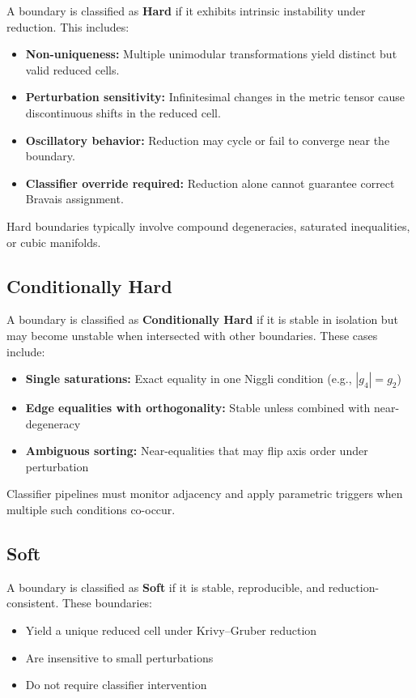 \documentclass[preprint]{iucr}              %
\begin{document}
A boundary is classified as \textbf{Hard} if it exhibits intrinsic instability under reduction. This includes:

\begin{itemize}
	\item \textbf{Non-uniqueness:} Multiple unimodular transformations yield distinct but valid reduced cells.
	\item \textbf{Perturbation sensitivity:} Infinitesimal changes in the metric tensor cause discontinuous shifts in the reduced cell.
	\item \textbf{Oscillatory behavior:} Reduction may cycle or fail to converge near the boundary.
	\item \textbf{Classifier override required:} Reduction alone cannot guarantee correct Bravais assignment.
\end{itemize}

Hard boundaries typically involve compound degeneracies, saturated inequalities, or cubic manifolds.

\subsection*{Conditionally Hard}

A boundary is classified as \textbf{Conditionally Hard} if it is stable in isolation but may become unstable when intersected with other boundaries. These cases include:

\begin{itemize}
	\item \textbf{Single saturations:} Exact equality in one Niggli condition (e.g., $|g_4| = g_2$)
	\item \textbf{Edge equalities with orthogonality:} Stable unless combined with near-degeneracy
	\item \textbf{Ambiguous sorting:} Near-equalities that may flip axis order under perturbation
\end{itemize}

Classifier pipelines must monitor adjacency and apply parametric triggers when multiple such conditions co-occur.

\subsection*{Soft}

A boundary is classified as \textbf{Soft} if it is stable, reproducible, and reduction-consistent. These boundaries:

\begin{itemize}
	\item Yield a unique reduced cell under Krivy--Gruber reduction
	\item Are insensitive to small perturbations
	\item Do not require classifier intervention
\end{itemize}
\end{document}
